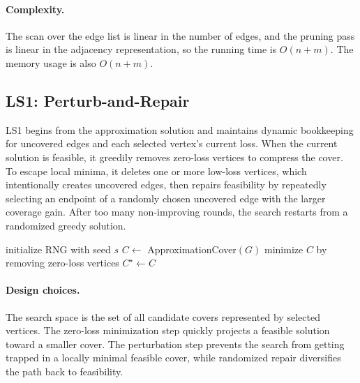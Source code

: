 \documentclass[sigconf,nonacm]{acmart}
\begin{document}
\paragraph{Complexity.}
The scan over the edge list is linear in the number of edges, and the pruning pass is linear in the adjacency representation, so the running time is $O(n+m)$. The memory usage is also $O(n+m)$.

\subsection{LS1: Perturb-and-Repair}
LS1 begins from the approximation solution and maintains dynamic bookkeeping for uncovered edges and each selected vertex's current loss. When the current solution is feasible, it greedily removes zero-loss vertices to compress the cover. To escape local minima, it deletes one or more low-loss vertices, which intentionally creates uncovered edges, then repairs feasibility by repeatedly selecting an endpoint of a randomly chosen uncovered edge with the larger coverage gain. After too many non-improving rounds, the search restarts from a randomized greedy solution.

\begin{algorithm}[t]
\caption{LS1: Perturb-and-Repair Local Search}
initialize RNG with seed $s$\;
$C \leftarrow$ ApproximationCover$(G)$\;
minimize $C$ by removing zero-loss vertices\;
$C^\star \leftarrow C$\;
\end{algorithm}

\paragraph{Design choices.}
The search space is the set of all candidate covers represented by selected vertices. The zero-loss minimization step quickly projects a feasible solution toward a smaller cover. The perturbation step prevents the search from getting trapped in a locally minimal feasible cover, while randomized repair diversifies the path back to feasibility.
\end{document}
